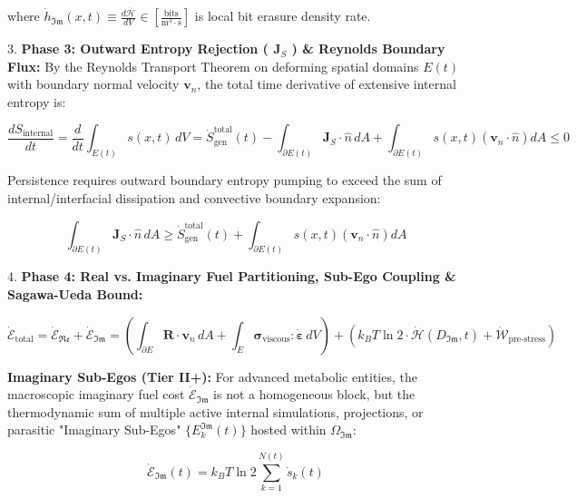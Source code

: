 \documentclass[11pt,a4paper]{article}
\theoremstyle{definition}
\theoremstyle{remark}
\begin{document}
where $\dot{h}_{\mathfrak{Im}}(x, t) \equiv \frac{d\dot{\mathcal{H}}}{dV} \in [\frac{\mathrm{bits}}{\mathrm{m^3 \cdot s}}]$ is local bit erasure density rate.

3. \textbf{Phase 3: Outward Entropy Rejection ( $\mathbf{J}_S$ ) \& Reynolds Boundary Flux:}
By the Reynolds Transport Theorem on deforming spatial domains $E(t)$ with boundary normal velocity $\mathbf{v}_n$, the total time derivative of extensive internal entropy is:


\begin{equation}
\boxed{\frac{dS_{\text{internal}}}{dt} = \frac{d}{dt} \int_{E(t)} s(x, t) \, dV = \dot{S}_{\text{gen}}^{\text{total}}(t) - \int_{\partial E(t)} \mathbf{J}_S \cdot \hat{n} \, dA + \int_{\partial E(t)} s(x, t) \left( \mathbf{v}_n \cdot \hat{n} \right) dA \le 0}
\end{equation}


Persistence requires outward boundary entropy pumping to exceed the sum of internal/interfacial dissipation and convective boundary expansion:


\begin{equation}
\int_{\partial E(t)} \mathbf{J}_S \cdot \hat{n} \, dA \ge \dot{S}_{\text{gen}}^{\text{total}}(t) + \int_{\partial E(t)} s(x, t) \left( \mathbf{v}_n \cdot \hat{n} \right) dA
\end{equation}


4. \textbf{Phase 4: Real vs. Imaginary Fuel Partitioning, Sub-Ego Coupling \& Sagawa-Ueda Bound:}


\begin{equation}
\dot{\mathcal{E}}_{\text{total}} = \dot{\mathcal{E}}_{\mathfrak{Re}} + \dot{\mathcal{E}}_{\mathfrak{Im}} = \left( \int_{\partial E} \mathbf{R} \cdot \mathbf{v}_n \, dA + \int_E \boldsymbol{\sigma}_{\text{viscous}} : \dot{\boldsymbol{\varepsilon}} \, dV \right) + \left( k_B T \ln 2 \cdot \dot{\mathcal{H}}(D_{\mathfrak{Im}}, t) + \dot{\mathcal{W}}_{\text{pre-stress}} \right)
\end{equation}


\textbf{Imaginary Sub-Egos (Tier II+):} For advanced metabolic entities, the macroscopic imaginary fuel cost $\dot{\mathcal{E}}_{\mathfrak{Im}}$ is not a homogeneous block, but the thermodynamic sum of multiple active internal simulations, projections, or parasitic "Imaginary Sub-Egos" $\{E_k^{\mathfrak{Im}}(t)\}$ hosted within $\Omega_{\mathfrak{Im}}$:


\begin{equation}
\boxed{\dot{\mathcal{E}}_{\mathfrak{Im}}(t) = k_B T \ln 2 \sum_{k=1}^{N(t)} \dot{s}_k(t)}
\end{equation}
\end{document}
